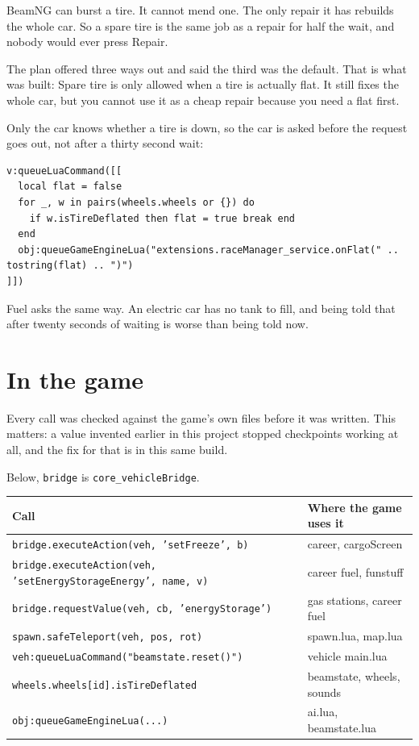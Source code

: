 \documentclass[11pt,a4paper]{article}
\newcommand{\code}[1]{\texttt{\small #1}}
\begin{document}
BeamNG can burst a tire. It cannot mend one. The only repair it has rebuilds the
whole car. So a spare tire is the same job as a repair for half the wait, and
nobody would ever press Repair.

The plan offered three ways out and said the third was the default. That is what
was built: Spare tire is only allowed when a tire is actually flat. It still
fixes the whole car, but you cannot use it as a cheap repair because you need a
flat first.

Only the car knows whether a tire is down, so the car is asked before the
request goes out, not after a thirty second wait:

\begin{lstlisting}
v:queueLuaCommand([[
  local flat = false
  for _, w in pairs(wheels.wheels or {}) do
    if w.isTireDeflated then flat = true break end
  end
  obj:queueGameEngineLua("extensions.raceManager_service.onFlat(" .. tostring(flat) .. ")")
]])
\end{lstlisting}

Fuel asks the same way. An electric car has no tank to fill, and being told that
after twenty seconds of waiting is worse than being told now.

\section{In the game}

Every call was checked against the game's own files before it was written. This
matters: a value invented earlier in this project stopped checkpoints working at
all, and the fix for that is in this same build.

Below, \code{bridge} is \code{core\_vehicleBridge}.

\begin{longtable}{@{}>{\raggedright\arraybackslash}p{74mm}>{\raggedright\arraybackslash}p{62mm}@{}}
\toprule
\textbf{Call} & \textbf{Where the game uses it} \\
\midrule
\endhead
\code{bridge.executeAction(veh, 'setFreeze', b)} & career, cargoScreen \\
\code{bridge.executeAction(veh, 'setEnergyStorageEnergy', name, v)} & career fuel, funstuff \\
\code{bridge.requestValue(veh, cb, 'energyStorage')} & gas stations, career fuel \\
\code{spawn.safeTeleport(veh, pos, rot)} & spawn.lua, map.lua \\
\code{veh:queueLuaCommand("beamstate.reset()")} & vehicle main.lua \\
\code{wheels.wheels[id].isTireDeflated} & beamstate, wheels, sounds \\
\code{obj:queueGameEngineLua(...)} & ai.lua, beamstate.lua \\
\bottomrule
\end{longtable}
\end{document}
